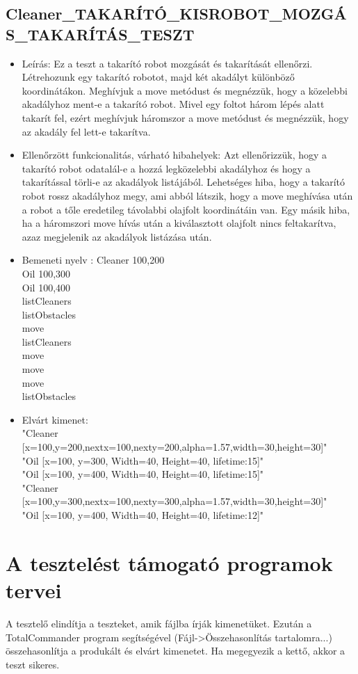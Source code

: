 \subsection{Cleaner\_TAKARÍTÓ\_KISROBOT\_MOZGÁS\_TAKARÍTÁS\_TESZT}
\begin{itemize}
	\item Leírás: Ez a teszt a takarító robot mozgását és takarítását ellenőrzi. Létrehozunk egy takarító robotot, majd két akadályt különböző koordinátákon. Meghívjuk a move metódust és megnézzük, hogy a közelebbi akadályhoz ment-e a takarító robot. Mivel egy foltot három lépés alatt takarít fel, ezért meghívjuk háromszor a move metódust és megnézzük, hogy az akadály fel lett-e takarítva.
\newline
	\item Ellenőrzött funkcionalitás, várható hibahelyek: Azt ellenőrizzük, hogy a takarító robot odatalál-e a hozzá legközelebbi akadályhoz és hogy a takarítással törli-e az akadályok listájából. Lehetséges hiba, hogy a takarító robot rossz akadályhoz megy, ami abból látszik, hogy a move meghívása után a robot a tőle eredetileg távolabbi olajfolt koordinátáin van. Egy másik hiba, ha a háromszori move hívás után a kiválasztott olajfolt nincs feltakarítva, azaz megjelenik az akadályok listázása után.

	\item Bemeneti nyelv :\newline
        Cleaner 100,200\\
        Oil 100,300\\
        Oil 100,400\\
        listCleaners\\
        listObstacles\\ 
        move\\
        listCleaners\\
        move\\
        move\\
        move\\
        listObstacles\\
		

	\item Elvárt kimenet: \\
	    "Cleaner [x=100,y=200,nextx=100,nexty=200,alpha=1.57,width=30,height=30]"\\
"Oil [x=100, y=300, Width=40, Height=40, lifetime:15]"\\
"Oil [x=100, y=400, Width=40, Height=40, lifetime:15]"\\
"Cleaner [x=100,y=300,nextx=100,nexty=300,alpha=1.57,width=30,height=30]"\\
"Oil [x=100, y=400, Width=40, Height=40, lifetime:12]"\newline
		
\end{itemize}

\section{A tesztelést támogató programok tervei}
A tesztelő elindítja a teszteket, amik fájlba írják kimenetüket. Ezután a TotalCommander program segítségével (Fájl->Összehasonlítás tartalomra...) összehasonlítja a produkált és elvárt kimenetet. Ha megegyezik a kettő, akkor a teszt sikeres.
